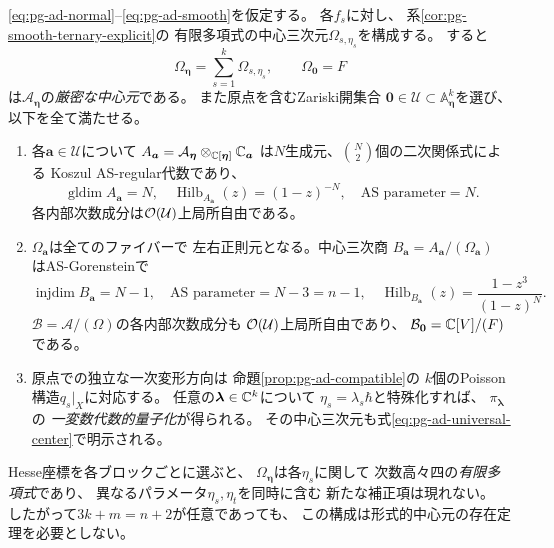 \begin{theorem}[任意次元の明示的な同時代数量子化]
\label{thm:pg-all-dimensions}
\eqref{eq:pg-ad-normal}--\eqref{eq:pg-ad-smooth}を仮定する。
各$f_s$に対し、
系\ref{cor:pg-smooth-ternary-explicit}の
有限多項式の中心三次元$\Omega_{s,\eta_s}$を構成する。
すると
\begin{equation}
 \boxed{\qquad
 \Omega_{\boldsymbol\eta}=\sum_{s=1}^k\Omega_{s,\eta_s},
 \qquad
 \Omega_{\boldsymbol0}=F
 \qquad}
 \label{eq:pg-ad-universal-center}
\end{equation}
は$\mathcal A_{\boldsymbol\eta}$の\emph{厳密な中心元}である。
また原点を含むZariski開集合
$\boldsymbol0\in\mathcal U\subset\mathbb A^k_{\boldsymbol\eta}$を選び、
以下を全て満たせる。
\begin{enumerate}[label=(\arabic*)]
\item 各$\boldsymbol a\in\mathcal U$について
$A_{\boldsymbol a}=\mathcal A_{\boldsymbol\eta}
 \otimes_{\mathbb C[\boldsymbol\eta]}\mathbb C_{\boldsymbol a}$
は$N$生成元、$\binom N2$個の二次関係式による
Koszul AS-regular代数であり、
\begin{equation}
 \operatorname{gldim}A_{\boldsymbol a}=N,\quad
 \operatorname{Hilb}_{A_{\boldsymbol a}}(z)=(1-z)^{-N},
 \quad\text{AS parameter}=N.
\end{equation}
各内部次数成分は$\mathcal O(\mathcal U)$上局所自由である。
\item $\Omega_{\boldsymbol a}$は全てのファイバーで
左右正則元となる。中心三次商
$B_{\boldsymbol a}=A_{\boldsymbol a}/(\Omega_{\boldsymbol a})$
はAS-Gorensteinで
\begin{equation}
 \operatorname{injdim}B_{\boldsymbol a}=N-1,\quad
 \text{AS parameter}=N-3=n-1,\quad
 \operatorname{Hilb}_{B_{\boldsymbol a}}(z)
 =\frac{1-z^3}{(1-z)^N}.
\end{equation}
$\mathcal B=\mathcal A/(\Omega)$の各内部次数成分も
$\mathcal O(\mathcal U)$上局所自由であり、
$\mathcal B_{\boldsymbol0}=\mathbb C[V]/(F)$である。
\item 原点での独立な一次変形方向は
命題\ref{prop:pg-ad-compatible}の
$k$個のPoisson構造$q_s|_X$に対応する。
任意の$\boldsymbol\lambda\in\mathbb C^k$について
$\eta_s=\lambda_s\hbar$と特殊化すれば、
$\pi_{\boldsymbol\lambda}$の
\emph{一変数代数的量子化}が得られる。
その中心三次元も式\eqref{eq:pg-ad-universal-center}で明示される。
\end{enumerate}
Hesse座標を各ブロックごとに選ぶと、
$\Omega_{\boldsymbol\eta}$は各$\eta_s$に関して
次数高々四の\emph{有限多項式}であり、
異なるパラメータ$\eta_s,\eta_t$を同時に含む
新たな補正項は現れない。
したがって$3k+m=n+2$が任意であっても、
この構成は形式的中心元の存在定理を必要としない。
\end{theorem}
